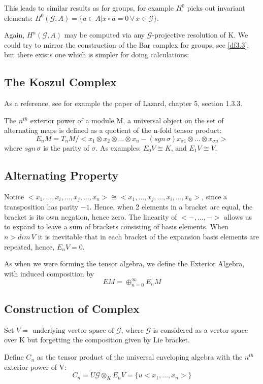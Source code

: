 This leads to similar results as for groups, for example $H^0$
picks out invariant elements: $H^0(\mathcal G,A) = \{ a\in A |
x\circ a = 0 \,\forall\, x\in \mathcal G \}$.

Again, $H^n(\mathcal G,A)$ may be computed via any $\mathcal
G$-projective resolution of K. We could try to mirror the
construction of the Bar complex for groups, see \ref{df3.3}, but
there exists one which is simpler for doing calculations:

\subsection{The Koszul Complex}\label{df4.2} As a reference,
see for example the paper of Lazard, chapter 5, section 1.3.3.

The $n^{th}$ exterior power of a module M, a universal object on
the set of alternating maps is defined as a quotient of the n-fold
tensor product:
$$E_nM = {T_nM}/{<x_1\otimes x_2\otimes \dots \otimes x_n -
(sgn\,\sigma )x_{\sigma 1} \otimes \dots\otimes x_{\sigma n}>}$$
where $sgn\,\sigma$ is the parity of $\sigma$. As examples:
$E_0V\cong K$, and $E_1V\cong V$.

\subsection{Alternating Property}\label{df4.2.1}
Notice $<x_1 , \dots , x_i ,\dots , x_j , \dots ,x_n > \cong <x_1
, \dots , x_j ,\dots , x_i , \dots ,x_n >$, since a transposition
has parity $-1$. Hence, when 2 elements in a bracket are equal,
the bracket is its own negation, hence zero. The linearity of
$<-,\dots ,->$ allows us to expand to leave a sum of brackets
consisting of basis elements. When $n>dim\,V$ it is inevitable
that in each bracket of the expansion basis elements are repeated,
hence, $E_nV=0$.

As when we were forming the tensor algebra, we define the Exterior
Algebra, with induced composition by
$$EM = \oplus_{n=0}^\infty E_n M$$

\subsection{Construction of Complex}\label{df4.2.2}
Set $V=\text{ underlying vector space of }\mathcal G$, where
$\mathcal G$ is considered as a vector space over K but forgetting
the composition given by Lie bracket.

Define $C_n$ as the tensor product of the universal enveloping
algebra with the $n^{th}$ exterior power of V:
$$C_n = U\mathcal G \otimes_K E_n V = \{ u<x_1, \dots , x_n>\}$$

